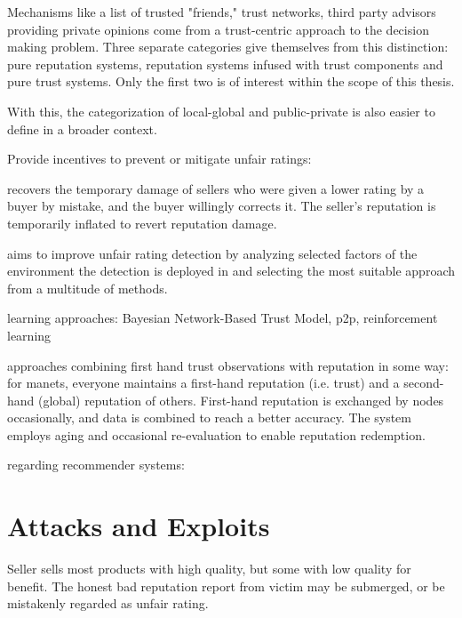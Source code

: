 \documentclass[%
    ]{\PathToTumTemplate/thesis/tum_thesis}
\begin{document}
Mechanisms like a list of trusted "friends," trust networks, third party advisors providing private opinions come from a trust-centric approach to the decision making problem. Three separate categories give themselves from this distinction: pure reputation systems, reputation systems infused with trust components and pure trust systems. Only the first two is of interest within the scope of this thesis.

With this, the categorization of local-global and public-private is also easier to define in a broader context.





Provide incentives to prevent or mitigate unfair ratings: 
\cite{thakur_reputation_2019}
\cite{jurca_minimum_2006}

\cite{liu_reputation_2015} recovers the temporary damage of sellers who were given a lower rating by a buyer by mistake, and the buyer willingly corrects it. The seller's reputation is temporarily inflated to revert reputation damage.

\cite{wan_context-aware_2012} aims to improve unfair rating detection by analyzing selected factors of the environment the detection is deployed in and selecting the most suitable approach from a multitude of methods. 

learning approaches:
\cite{khoshkbarchi_coping_2017}
\cite{wang_bayesian_2003} Bayesian Network-Based Trust Model, \gls{p2p}, reinforcement learning
\cite{yazidi_solving_2017}

approaches combining first hand trust observations with reputation in some way:
\cite{boudec_robust_2003} for manets, everyone maintains a first-hand reputation (i.e. trust) and a second-hand (global) reputation of others. First-hand reputation is exchanged by nodes occasionally, and data is combined to reach a better accuracy. The system employs aging and occasional re-evaluation to enable reputation redemption.
\cite{huynh_handling_2005}

regarding recommender systems:
\cite{hutchison_combining_2013}

\section{Attacks and Exploits}\label{sec:attacks}

Seller sells most products with high quality, but some with low quality for benefit. The honest bad reputation report from victim may be submerged, or be mistakenly regarded as unfair rating. \cite{ping_xu_rating_2005}
\end{document}

